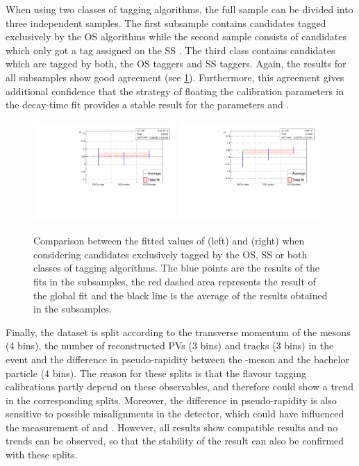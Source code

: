 When using two classes of tagging algorithms, the full sample can be divided into three independent samples.
The first subsample contains candidates tagged exclusively by the OS algorithms while the second sample consists of candidates which only got a tag assigned on the SS .
The third class contains candidates which are tagged by both, the OS taggers and SS taggers.
Again, the results for all subsamples show good agreement (see \cref{fig:splitByTagger}).
Furthermore, this agreement gives additional confidence that the strategy of floating the calibration parameters in the decay-time fit provides a stable result for the \CP parameters \Sf and \Sfbar.
\begin{figure}[tbp]
    \centering
    \includegraphics[width=0.48\textwidth]{09TimeFit/figs/Sf_splits_SSOSExclusive.pdf}
    \includegraphics[width=0.48\textwidth]{09TimeFit/figs/Sfbar_splits_SSOSExclusive.pdf}
    \caption{Comparison between the fitted values of \Sf (left) and \Sfbar (right) when considering candidates exclusively tagged by the OS, SS or both classes of tagging algorithms.
    The blue points are the results of the fits in the subsamples, the red dashed area represents the result of the global fit and the black line is the average of the results obtained in the subsamples.}
    \label{fig:splitByTagger}
\end{figure}

Finally, the dataset is split according to the transverse momentum of the \Bz mesons (\num{4} bins), the number of reconstructed \ac{PV}s (\num{3} bins) and tracks (\num{3} bins) in the event and the difference in pseudo-rapidity between the \Dpm-meson and the bachelor particle (\num{4} bins).
The reason for these splits is that the flavour tagging calibrations partly depend on these observables, and therefore could show a trend in the corresponding splits.
Moreover, the difference in pseudo-rapidity is also sensitive to possible misalignments in the detector, which could have influenced the measurement of \Sf and \Sfbar.
However, all results show compatible results and no trends can be observed, so that the stability of the result can also be confirmed with these splits.

